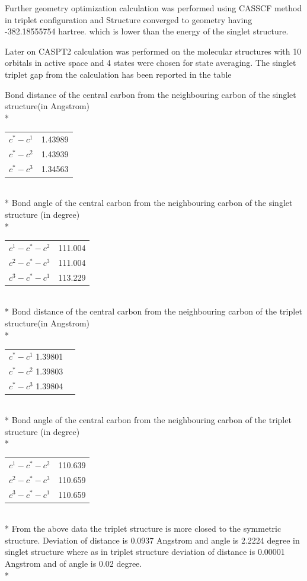 \documentclass{article}
\begin{document}
Further geometry optimization calculation was performed using CASSCF method in triplet configuration and Structure converged to geometry having -382.18555754 hartree. which is lower than the energy of the singlet structure.


Later on CASPT2 calculation was performed on the molecular structures with 10 orbitals in active space and 4 states were chosen for state averaging. The singlet triplet gap from the calculation has been reported in the table 


Bond distance of the central carbon from the neighbouring carbon of the singlet structure(in Angstrom)\\*


\begin{tabular}{c c}
\(c^{*}-c^{1}\) & 1.43989 \\
\(c^{*}-c^{2}\) & 1.43939 \\
\(c^{*}-c^{3}\) & 1.34563 \\
\end{tabular}\\*
Bond angle of the central carbon from the neighbouring carbon of the singlet structure (in degree)\\*

\begin{tabular}{c c}
\(c^{1}-c^{*}-c^{2}\) & 111.004\\
\(c^{2}-c^{*}-c^{3}\) & 111.004\\
\(c^{3}-c^{*}-c^{1}\) & 113.229\\
\end{tabular}\\*
Bond distance of the central carbon from the neighbouring carbon of the triplet structure(in Angstrom)\\*

\begin{tabular}{c c}
\(c^{*}-c^{1}\) 1.39801 \\
\(c^{*}-c^{2}\) 1.39803 \\
\(c^{*}-c^{3}\) 1.39804 \\
\end{tabular}\\*
Bond angle of the central carbon from the neighbouring carbon of the triplet structure (in degree)\\*

\begin{tabular}{c c}
\(c^{1}-c^{*}-c^{2}\) & 110.639 \\
\(c^{2}-c^{*}-c^{3}\) & 110.659 \\
\(c^{3}-c^{*}-c^{1}\) & 110.659 \\
\end{tabular}\\*
From the above data the triplet structure is more closed to the symmetric structure. 
Deviation of distance is 0.0937 Angstrom and angle is 2.2224 degree in singlet structure where as in triplet structure deviation of distance is 0.00001 Angstrom and of angle is 0.02 degree.\\*
\end{document}
